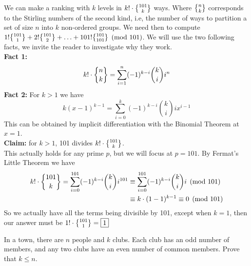 \begin{solution}[(overkill)]
    We can make a ranking with $k$ levels in $k! \cdot \stirling{101}{k}$ ways. Where $\stirling{n}{k}$ corresponds to the Stirling numbers of the second kind, i.e, the number of ways to partition a set of size $n$ into $k$ non-ordered groups. We need then to compute $1!\stirling{101}{1} + 2!\stirling{101}{2} + \ldots + 101!\stirling{101}{101} \pmod{101}$. We will use the two following facts, we invite the reader to investigate why they work. \\[3mm]
    \textbf{Fact 1:} 
    $$ k! \cdot  \stirling{n}{k} = \sum_{i=1}^n(-1)^{k-i} \binom{k}{i} i^n$$
    \textbf{Fact 2:} For $k>1$ we have
    $$ k(x-1)^{k-1} = \sum_{i=0}^k (-1)^{k-i} \binom{k}{i} i x^{i-1}$$
    This can be obtained by implicit differentiation with the Binomial Theorem at $x=1$. \\[2mm]
    \textbf{Claim: } for $k > 1$, 101 divides $ k! \cdot \stirling{101}{k}$. \\
    This actually holds for any prime $p$, but we will focus at $p=101$. By Fermat's Little Theorem we have
    \begin{align*}
        k! \cdot  \stirling{101}{k} = \sum_{i=0}^{101}(-1)^{k-i} \binom{k}{i} i^{101} &\equiv   \sum_{i=0}^{101} (-1)^{k-i} \binom{k}{i} i \pmod{101} \\
        &\equiv  k \cdot (1-1)^{k-1} \equiv 0 \pmod{101}
    \end{align*}
    So we actually have all the terms being divisible by 101, except when $k=1$, then our answer must be $1! \cdot \stirling{101}{1} = \boxed{1}$
\end{solution}

\begin{problem}[C][8][Folklore]
    In a town, there are $n$ people and $k$ clubs. Each club has an odd number of members,
and any two clubs have an even number of common members. Prove that $k \le n$.
\end{problem}

